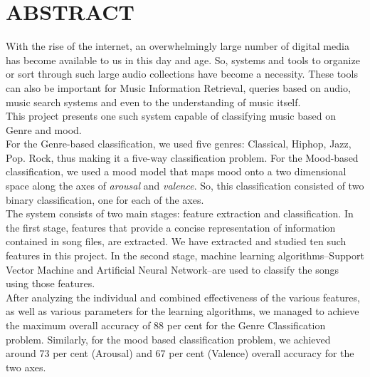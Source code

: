 \newpage
\section*{ABSTRACT}

With the rise of the internet, an overwhelmingly large number of digital media has become available to us in this day and age.
So, systems and tools to organize or sort through such large audio collections have become a necessity. 
These tools can also be important for Music Information Retrieval, queries based on audio, music search systems and even to the understanding of music itself.
\\
This project presents one such system capable of classifying music based on Genre and mood.
\\
For the Genre-based classification, we used five genres: Classical, Hiphop, Jazz, Pop. Rock, thus making it a five-way classification problem.
For the Mood-based classification, we used a mood model that maps mood onto a two dimensional space along the axes of \textit{arousal} and \textit{valence}.
So, this classification consisted of two binary classification, one for each of the axes.
\\
The system consists of two main stages: feature extraction and classification. 
In the first stage, features that provide a concise representation of information contained in song files, are extracted. 
We have extracted and studied ten such features in this project.
In the second stage, machine learning algorithms--Support Vector Machine and Artificial Neural Network--are used to classify the songs using those features.
\\
After analyzing the individual and combined effectiveness of the various features, as well as various parameters for the learning algorithms, we managed to achieve
the maximum overall accuracy of 88 per cent for the Genre Classification problem.
Similarly, for the mood based classification problem, we achieved around 73 per cent (Arousal) and 67 per cent (Valence) overall accuracy for the two axes.

